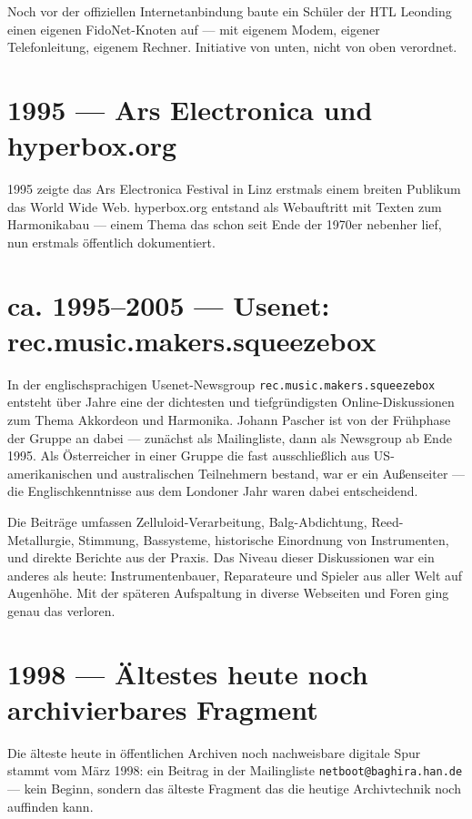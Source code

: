 \documentclass[a4paper,12pt]{article}
\begin{document}
Noch vor der offiziellen Internetanbindung baute ein Schüler der HTL Leonding einen eigenen FidoNet-Knoten auf --- mit eigenem Modem, eigener Telefonleitung, eigenem Rechner. Initiative von unten, nicht von oben verordnet.

\section{1995 --- Ars Electronica und hyperbox.org}

1995 zeigte das Ars Electronica Festival in Linz erstmals einem breiten Publikum das World Wide Web. hyperbox.org entstand als Webauftritt mit Texten zum Harmonikabau --- einem Thema das schon seit Ende der 1970er nebenher lief, nun erstmals öffentlich dokumentiert.

\section{ca. 1995--2005 --- Usenet: rec.music.makers.squeezebox}

In der englischsprachigen Usenet-Newsgroup \texttt{rec.music.makers.squeezebox} entsteht über Jahre eine der dichtesten und tiefgründigsten Online-Diskussionen zum Thema Akkordeon und Harmonika. Johann Pascher ist von der Frühphase der Gruppe an dabei --- zunächst als Mailingliste, dann als Newsgroup ab Ende 1995. Als Österreicher in einer Gruppe die fast ausschließlich aus US-amerikanischen und australischen Teilnehmern bestand, war er ein Außenseiter --- die Englischkenntnisse aus dem Londoner Jahr waren dabei entscheidend.

Die Beiträge umfassen Zelluloid-Verarbeitung, Balg-Abdichtung, Reed-Metallurgie, Stimmung, Bassysteme, historische Einordnung von Instrumenten, und direkte Berichte aus der Praxis. Das Niveau dieser Diskussionen war ein anderes als heute: Instrumentenbauer, Reparateure und Spieler aus aller Welt auf Augenhöhe. Mit der späteren Aufspaltung in diverse Webseiten und Foren ging genau das verloren.

\section{1998 --- Ältestes heute noch archivierbares Fragment}

Die älteste heute in öffentlichen Archiven noch nachweisbare digitale Spur stammt vom März 1998: ein Beitrag in der Mailingliste \texttt{netboot@baghira.han.de} --- kein Beginn, sondern das älteste Fragment das die heutige Archivtechnik noch auffinden kann.
\end{document}
